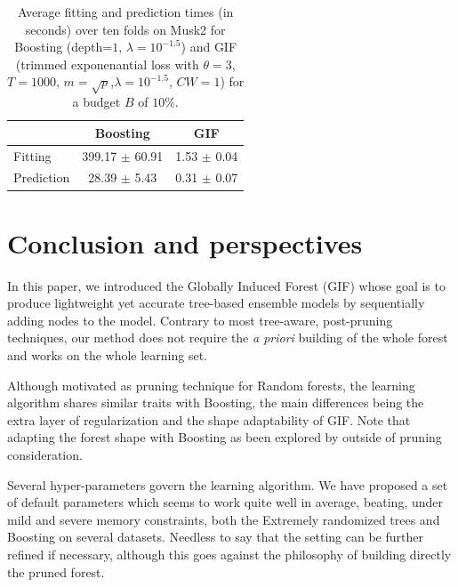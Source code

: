 \documentclass{article}
\begin{document}
\begin{table}[t]
\caption{Average fitting and prediction times (in seconds) over ten folds on 
Musk2 for Boosting (depth=$1$, $\lambda=10^{-1.5}$) and GIF (trimmed 
exponenantial loss with $\theta=3$, $T=1000$, $m=\sqrt{p}$,$\lambda=10^{-1.5}$, 
$CW=1$) for a budget $B$ of $10\%$.}
\label{tab:boostingTime}
\begin{center}
\begin{small}
\begin{tabular}{l|c|c}
\hline
& Boosting & GIF \\
\hline
Fitting & 399.17 $\pm$ 60.91 & 1.53 $\pm$ 0.04 \\
Prediction & 28.39 $\pm$ 5.43 & 0.31 $\pm$ 0.07 \\
\hline
\end{tabular}
\end{small}
\end{center}
\vskip -0.1in
\end{table}








\section{Conclusion and perspectives}
\label{sec:conclusion}

In this paper, we introduced the Globally Induced Forest (GIF) whose goal is to 
produce lightweight yet accurate tree-based ensemble models by sequentially 
adding nodes to the model. Contrary to most tree-aware, post-pruning 
techniques, our method does not require the {\it a priori} building of the 
whole forest and works on the whole learning set.

Although motivated as pruning technique for Random forests, the learning 
algorithm shares similar traits with Boosting, the main differences being the 
extra layer of regularization and the shape adaptability of GIF. Note that 
adapting the forest shape with Boosting as been explored by 
\citet{johnson2014regforest} outside of pruning consideration.

Several hyper-parameters govern the learning algorithm. We have proposed a set 
of default parameters which seems to work quite well in average, beating, under 
mild and severe memory constraints, both the Extremely randomized trees and 
Boosting on several datasets. Needless to say that the setting can be further 
refined if necessary, although this goes against the philosophy of building 
directly the pruned forest.
\end{document}
